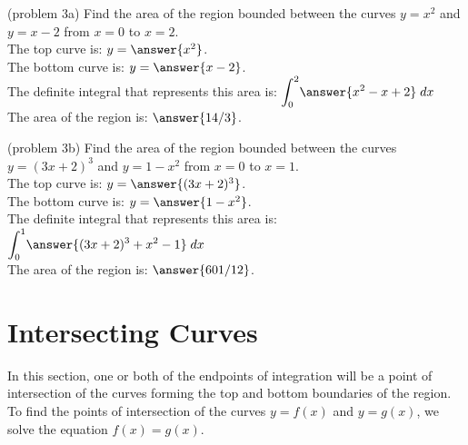 \documentclass{ximera}
\begin{document}
\begin{problem}(problem 3a)
Find the area of the region bounded between the curves $y = x^2$ and $y = x - 2$ from $x = 0$ to $x = 2$.\\
The top curve is: $y = \answer{x^2}$.\\
The bottom curve is: $y = \answer{x - 2}$.\\
The definite integral that represents this area is: $\displaystyle{\int_0^2} \answer{x^2 - x + 2} \; dx$\\
The area of the region is: $\answer{14/3}$.
\end{problem}



\begin{problem}(problem 3b)
Find the area of the region bounded between the curves $y = (3x+2)^3$ and $y = 1 - x^2$ from $x = 0$ to $x = 1$.\\
The top curve is: $y = \answer{(3x+2)^3}$.\\
The bottom curve is: $y = \answer{1-x^2}$.\\
The definite integral that represents this area is: $\displaystyle{\int_0^1 } \answer{(3x+2)^3  + x^2 - 1} \; dx$\\
The area of the region is: $\answer{601/12}$.
\end{problem}

\section{Intersecting Curves}
In this section, one or both of the endpoints of integration will be a point of intersection of the curves forming the top and bottom 
boundaries of the region.  To find the points of intersection of the curves $y = f(x)$ and $y = g(x)$, we solve the equation $f(x) = g(x)$.
\end{document}
